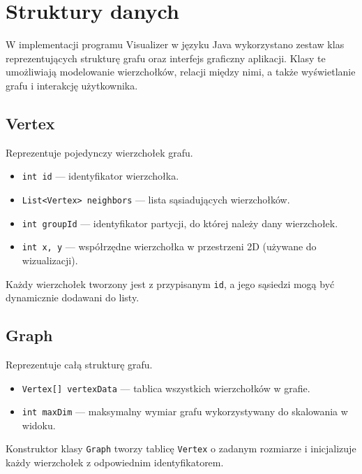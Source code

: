 \documentclass[a4paper,12pt]{article}
\begin{document}
\section{Struktury danych}
W implementacji programu Visualizer w języku Java wykorzystano zestaw klas reprezentujących strukturę grafu oraz interfejs graficzny aplikacji. Klasy te umożliwiają modelowanie wierzchołków, relacji między nimi, a także wyświetlanie grafu i interakcję użytkownika.

\subsection*{Vertex}
Reprezentuje pojedynczy wierzchołek grafu.
\begin{itemize}
  \item \texttt{int id} --- identyfikator wierzchołka.
  \item \texttt{List<Vertex> neighbors} --- lista sąsiadujących wierzchołków.
  \item \texttt{int groupId} --- identyfikator partycji, do której należy dany wierzchołek.
  \item \texttt{int x, y} --- współrzędne wierzchołka w przestrzeni 2D (używane do wizualizacji).
\end{itemize}
Każdy wierzchołek tworzony jest z przypisanym \texttt{id}, a jego sąsiedzi mogą być dynamicznie dodawani do listy.

\subsection*{Graph}
Reprezentuje całą strukturę grafu.
\begin{itemize}
  \item \texttt{Vertex[] vertexData} --- tablica wszystkich wierzchołków w grafie.
  \item \texttt{int maxDim} --- maksymalny wymiar grafu wykorzystywany do skalowania w widoku.
\end{itemize}
Konstruktor klasy \texttt{Graph} tworzy tablicę \texttt{Vertex} o zadanym rozmiarze i inicjalizuje każdy wierzchołek z odpowiednim identyfikatorem.
\end{document}
